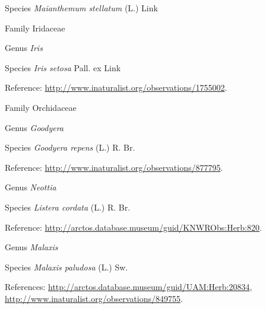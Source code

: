 \documentclass[9pt, article]{memoir}
\begin{document}
\begin{multicols}{2}
\vspace{6pt}\noindent\hspace{36pt}Species \textit{Maianthemum stellatum} (L.) Link


\vspace{6pt}\noindent\hspace{24pt}Family Iridaceae


\vspace{6pt}\noindent\hspace{30pt}Genus \textit{Iris}


\vspace{6pt}\noindent\hspace{36pt}Species \textit{Iris setosa} Pall. ex Link


\vspace{6pt}Reference: 
\url{http://www.inaturalist.org/observations/1755002}.

\vspace{6pt}\noindent\hspace{24pt}Family Orchidaceae


\vspace{6pt}\noindent\hspace{30pt}Genus \textit{Goodyera}


\vspace{6pt}\noindent\hspace{36pt}Species \textit{Goodyera repens} (L.) R. Br.


\vspace{6pt}Reference: 
\url{http://www.inaturalist.org/observations/877795}.

\vspace{6pt}\noindent\hspace{30pt}Genus \textit{Neottia}


\vspace{6pt}\noindent\hspace{36pt}Species \textit{Listera cordata} (L.) R. Br.


\vspace{6pt}Reference: 
\url{http://arctos.database.museum/guid/KNWRObs:Herb:820}.

\vspace{6pt}\noindent\hspace{30pt}Genus \textit{Malaxis}


\vspace{6pt}\noindent\hspace{36pt}Species \textit{Malaxis paludosa} (L.) Sw.


\vspace{6pt}References: 
\url{http://arctos.database.museum/guid/UAM:Herb:20834}, 
\url{http://www.inaturalist.org/observations/849755}.


\end{multicols}
\end{document}
